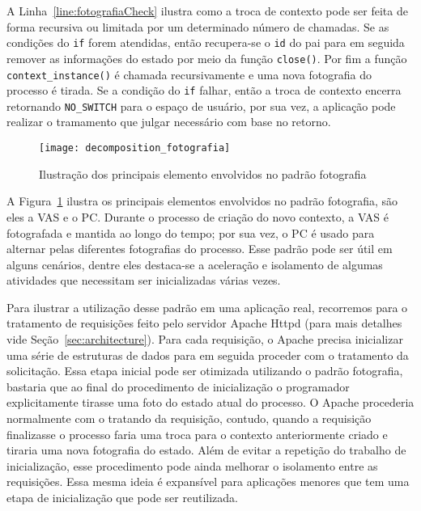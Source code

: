 A Linha~\ref{line:fotografiaCheck} ilustra como a troca de contexto pode ser
feita de forma recursiva ou limitada por um determinado número de chamadas. Se
as condições do \texttt{if} forem atendidas, então recupera-se o \texttt{id} do
pai para em seguida remover as informações do estado por meio da função
\texttt{close()}. Por fim a função \texttt{context\_instance()} é chamada
recursivamente e uma nova fotografia do processo é tirada. Se a condição do
\texttt{if} falhar, então a troca de contexto encerra retornando
\texttt{NO\_SWITCH} para o espaço de usuário, por sua vez, a aplicação pode
realizar o tramamento que julgar necessário com base no retorno.

\begin{figure}[!h]
  \centering
  \texttt{[image: decomposition\_fotografia]}
  \caption{Ilustração dos principais elemento envolvidos no padrão fotografia}
  \label{fig:decomposicao_fotografia}
\end{figure}

A Figura~\ref{fig:decomposicao_fotografia} ilustra os principais elementos
envolvidos no padrão fotografia, são eles a VAS e o PC. Durante o processo de
criação do novo contexto, a VAS é fotografada e mantida ao longo do tempo; por
sua vez, o PC é usado para alternar pelas diferentes fotografias do processo.
Esse padrão pode ser útil em alguns cenários, dentre eles destaca-se a
aceleração e isolamento de algumas atividades que necessitam ser inicializadas
várias vezes.

Para ilustrar a utilização desse padrão em uma aplicação real, recorremos para
o tratamento de requisições feito pelo servidor Apache Httpd (para mais
detalhes vide Seção~\ref{sec:architecture}). Para cada requisição, o Apache
precisa inicializar uma série de estruturas de dados para em seguida proceder
com o tratamento da solicitação. Essa etapa inicial pode ser otimizada
utilizando o padrão fotografia, bastaria que ao final do procedimento de
inicialização o programador explicitamente tirasse uma foto do estado atual do
processo. O Apache procederia normalmente com o tratando da requisição,
contudo, quando a requisição finalizasse o processo faria uma troca para o
contexto anteriormente criado e tiraria uma nova fotografia do estado. Além de
evitar a repetição do trabalho de inicialização, esse procedimento pode ainda
melhorar o isolamento entre as requisições. Essa mesma ideia é expansível para
aplicações menores que tem uma etapa de inicialização que pode ser reutilizada.


